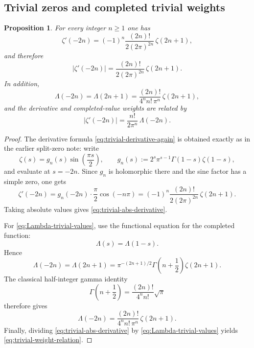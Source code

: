 \documentclass[11pt,a4paper]{article}
\newtheorem{proposition}[theorem]{Proposition}
\theoremstyle{definition}
\theoremstyle{remark}
\begin{document}
\subsection{Trivial zeros and completed trivial weights}

\begin{proposition}\label{prop:trivial-derivative-and-Lambda}
For every integer $n\ge 1$ one has
\begin{equation}\label{eq:trivial-derivative-again}
\zeta'(-2n)=(-1)^n\frac{(2n)!}{2(2\pi)^{2n}}\,\zeta(2n+1),
\end{equation}
and therefore
\begin{equation}\label{eq:trivial-abs-derivative}
\bigl|\zeta'(-2n)\bigr|=\frac{(2n)!}{2(2\pi)^{2n}}\,\zeta(2n+1).
\end{equation}
In addition,
\begin{equation}\label{eq:Lambda-trivial-values}
\Lambda(-2n)=\Lambda(2n+1)=\frac{(2n)!}{4^n n!\,\pi^n}\,\zeta(2n+1),
\end{equation}
and the derivative and completed-value weights are related by
\begin{equation}\label{eq:trivial-weight-relation}
\bigl|\zeta'(-2n)\bigr|=\frac{n!}{2\pi^n}\,\Lambda(-2n).
\end{equation}
\end{proposition}

\begin{proof}
The derivative formula \eqref{eq:trivial-derivative-again} is obtained exactly as in the earlier split-zero note: write
\[
\zeta(s)=g_n(s)\sin\!\left(\frac{\pi s}{2}\right),
\qquad
g_n(s):=2^s\pi^{s-1}\Gamma(1-s)\zeta(1-s),
\]
and evaluate at $s=-2n$.  Since $g_n$ is holomorphic there and the sine factor has a simple zero, one gets
\[
\zeta'(-2n)=g_n(-2n)\cdot \frac{\pi}{2}\cos(-n\pi)
=(-1)^n\frac{(2n)!}{2(2\pi)^{2n}}\,\zeta(2n+1).
\]
Taking absolute values gives \eqref{eq:trivial-abs-derivative}.

For \eqref{eq:Lambda-trivial-values}, use the functional equation for the completed function:
\[
\Lambda(s)=\Lambda(1-s).
\]
Hence
\[
\Lambda(-2n)=\Lambda(2n+1)=\pi^{-(2n+1)/2}\Gamma\!\left(n+\frac12\right)\zeta(2n+1).
\]
The classical half-integer gamma identity
\[
\Gamma\!\left(n+\frac12\right)=\frac{(2n)!}{4^n n!}\sqrt\pi
\]
therefore gives
\[
\Lambda(-2n)=\frac{(2n)!}{4^n n!\,\pi^n}\,\zeta(2n+1).
\]
Finally, dividing \eqref{eq:trivial-abs-derivative} by \eqref{eq:Lambda-trivial-values} yields \eqref{eq:trivial-weight-relation}.
\end{proof}
\end{document}
